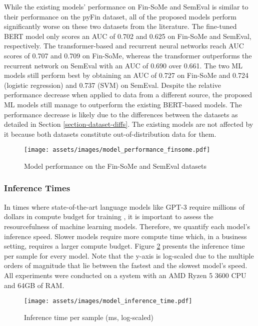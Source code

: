 While the existing models' performance on Fin-SoMe and SemEval is similar to their performance on the pyFin dataset, all of the proposed models perform significantly worse on these two datasets from the literature. The fine-tuned BERT model only scores an AUC of 0.702 and 0.625 on Fin-SoMe and SemEval, respectively. The transformer-based and recurrent neural networks reach AUC scores of 0.707 and 0.709 on Fin-SoMe, whereas the transformer outperforms the recurrent network on SemEval with an AUC of 0.690 over 0.661. The two ML models still perform best by obtaining an AUC of 0.727 on Fin-SoMe and 0.724 (logistic regression) and 0.737 (SVM) on SemEval. Despite the relative performance decrease when applied to data from a different source, the proposed ML models still manage to outperform the existing BERT-based models. The performance decrease is likely due to the differences between the datasets as detailed in Section \ref{section-dataset-diffs}. The existing models are not affected by it because both datasets constitute out-of-distribution data for them.

\begin{figure}[!ht]
	\texttt{[image: assets/images/model\_performance\_finsome.pdf]}	
	\caption{Model performance on the Fin-SoMe and SemEval datasets}
	\label{figure-model-performance-stocktwits}
\end{figure}



\subsubsection{Inference Times}
In times where state-of-the-art language models like GPT-3 require millions of dollars in compute budget for training , it is important to assess the resourcefulness of machine learning models. Therefore, we quantify each model's inference speed. Slower models require more compute time which, in a business setting, requires a larger compute budget. Figure \ref{figure-model-inference-times} presents the inference time per sample for every model. Note that the y-axis is log-scaled due to the multiple orders of magnitude that lie between the fastest and the slowest model's speed. All experiments were conducted on a system with an AMD Ryzen 5 3600 CPU and 64GB of RAM.

\begin{figure}[!ht]
	\texttt{[image: assets/images/model\_inference\_time.pdf]}	
	\caption{Inference time per sample (ms, log-scaled)}
	\label{figure-model-inference-times}
\end{figure}

